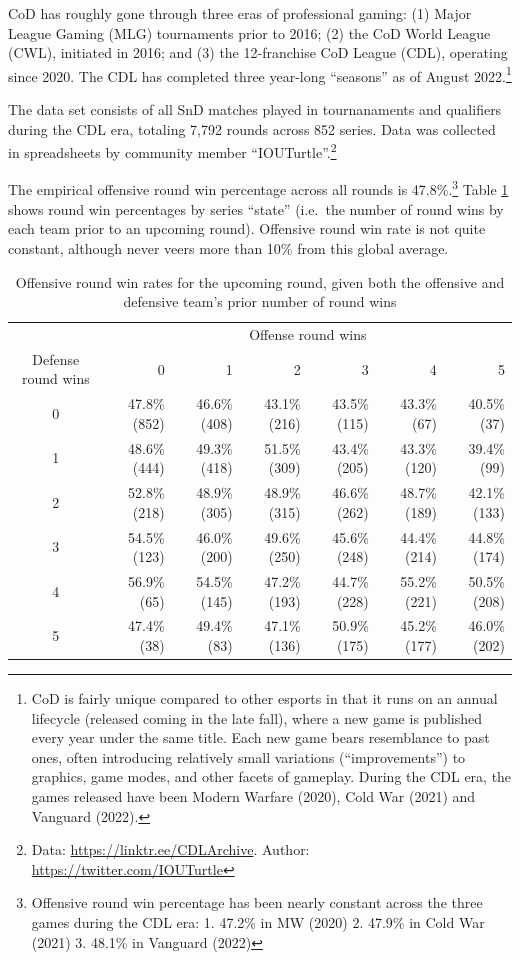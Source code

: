 \documentclass{article}
\begin{document}
CoD has roughly gone through three eras of professional gaming: (1)
Major League Gaming (MLG) tournaments prior to 2016; (2) the CoD World
League (CWL), initiated in 2016; and (3) the 12-franchise CoD League
(CDL), operating since 2020. The CDL has completed three year-long
``seasons'' as of August 2022.\footnote{CoD is fairly unique compared to
  other esports in that it runs on an annual lifecycle (released coming
  in the late fall), where a new game is published every year under the
  same title. Each new game bears resemblance to past ones, often
  introducing relatively small variations (``improvements'') to
  graphics, game modes, and other facets of gameplay. During the CDL
  era, the games released have been Modern Warfare (2020), Cold War
  (2021) and Vanguard (2022).}

The data set consists of all SnD matches played in tournanaments and
qualifiers during the CDL era, totaling 7,792 rounds across 852 series.
Data was collected in spreadsheets by community member
``IOUTurtle''.\footnote{Data: \url{https://linktr.ee/CDLArchive}.
  Author: \url{https://twitter.com/IOUTurtle}}

The empirical offensive round win percentage across all rounds is
47.8\%.\footnote{Offensive round win percentage has been nearly constant
  across the three games during the CDL era: 1. 47.2\% in MW (2020) 2.
  47.9\% in Cold War (2021) 3. 48.1\% in Vanguard (2022)} Table
\ref{tbl:cod-o-win-prop-by-series-state} shows round win percentages by
series ``state'' (i.e.~the number of round wins by each team prior to an
upcoming round). Offensive round win rate is not quite constant,
although never veers more than 10\% from this global average.

\begin{longtable}{crrrrrr}
\caption{Offensive round win rates for the upcoming round, given both the offensive and defensive team's prior number of round wins}\label{tbl:cod-o-win-prop-by-series-state} \\
\toprule
& \multicolumn{6}{c}{Offense round wins} \\ 
\cmidrule(lr){2-7}
Defense round wins & 0 & 1 & 2 & 3 & 4 & 5 \\ 
\midrule
0 & 47.8\%
(852) & 46.6\%
(408) & 43.1\%
(216) & 43.5\%
(115) & 43.3\%
(67) & 40.5\%
(37) \\ 
1 & 48.6\%
(444) & 49.3\%
(418) & 51.5\%
(309) & 43.4\%
(205) & 43.3\%
(120) & 39.4\%
(99) \\ 
2 & 52.8\%
(218) & 48.9\%
(305) & 48.9\%
(315) & 46.6\%
(262) & 48.7\%
(189) & 42.1\%
(133) \\ 
3 & 54.5\%
(123) & 46.0\%
(200) & 49.6\%
(250) & 45.6\%
(248) & 44.4\%
(214) & 44.8\%
(174) \\ 
4 & 56.9\%
(65) & 54.5\%
(145) & 47.2\%
(193) & 44.7\%
(228) & 55.2\%
(221) & 50.5\%
(208) \\ 
5 & 47.4\%
(38) & 49.4\%
(83) & 47.1\%
(136) & 50.9\%
(175) & 45.2\%
(177) & 46.0\%
(202) \\ 
\bottomrule
\end{longtable}
\end{document}

